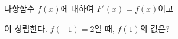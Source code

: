 다항함수 $f(x)$에 대하여 $F'(x)=f(x)$이고\par\smallskip{}\par\smallskip\noindent 이 성립한다. $f(-1)=2$일 때, $f(1)$의 값은?

